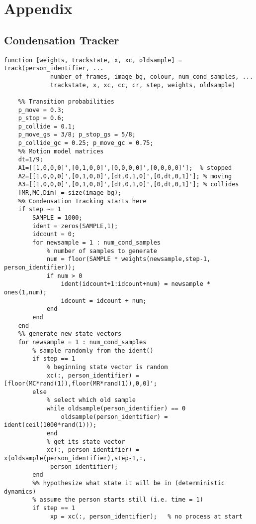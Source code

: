 \documentclass{article}
\begin{document}
\section{Appendix}

\subsection{Condensation Tracker}

\begin{lstlisting}
function [weights, trackstate, x, xc, oldsample] = track(person_identifier, ...
             number_of_frames, image_bg, colour, num_cond_samples, ...
             trackstate, x, xc, cc, cr, step, weights, oldsample)

    %% Transition probabilities
    p_move = 0.3;
    p_stop = 0.6;
    p_collide = 0.1;
    p_move_gs = 3/8; p_stop_gs = 5/8;
    p_collide_gc = 0.25; p_move_gc = 0.75;
    %% Motion model matrices
    dt=1/9;
    A1=[[1,0,0,0]',[0,1,0,0]',[0,0,0,0]',[0,0,0,0]'];  % stopped
    A2=[[1,0,0,0]',[0,1,0,0]',[dt,0,1,0]',[0,dt,0,1]']; % moving
    A3=[[1,0,0,0]',[0,1,0,0]',[dt,0,1,0]',[0,dt,0,1]']; % collides
    [MR,MC,Dim] = size(image_bg);
    %% Condensation Tracking starts here
    if step ~= 1
        SAMPLE = 1000;
        ident = zeros(SAMPLE,1);
        idcount = 0;
        for newsample = 1 : num_cond_samples    
            % number of samples to generate
            num = floor(SAMPLE * weights(newsample,step-1, person_identifier));  
            if num > 0
                ident(idcount+1:idcount+num) = newsample * ones(1,num);
                idcount = idcount + num; 
            end
        end
    end
    %% generate new state vectors
    for newsample = 1 : num_cond_samples
        % sample randomly from the ident()
        if step == 1 
            % beginning state vector is random
            xc(:, person_identifier) = [floor(MC*rand(1)),floor(MR*rand(1)),0,0]';
        else
            % select which old sample
            while oldsample(person_identifier) == 0
                oldsample(person_identifier) = ident(ceil(1000*rand(1)));  
            end
            % get its state vector
            xc(:, person_identifier) = x(oldsample(person_identifier),step-1,:,
             person_identifier);  
        end
        %% hypothesize what state it will be in (deterministic dynamics) 
        % assume the person starts still (i.e. time = 1)
        if step == 1    
             xp = xc(:, person_identifier);   % no process at start

\end{lstlisting}
\end{document}
